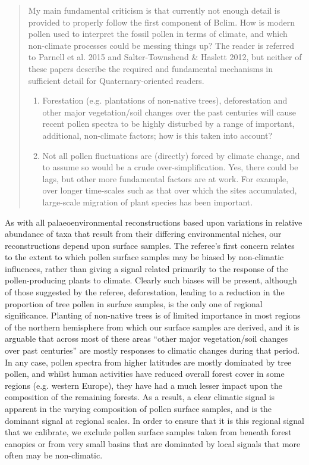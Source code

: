 \documentclass[a4paper,11pt]{article}
\begin{document}
\begin{framed} \begin{quote}
My main fundamental criticism is that currently not enough detail is provided to properly follow the first component of Bclim. How is modern pollen used to interpret the fossil pollen in terms of climate, and which non-climate processes could be messing things up? The reader is referred to Parnell et al. 2015 and Salter-Townshend \& Haslett 2012, but neither of these papers describe the required and fundamental mechanisms in sufficient detail for Quaternary-oriented readers.
\begin{enumerate}
\setcounter{enumi}{0}
\item Forestation (e.g. plantations of non-native trees), deforestation and other major vegetation/soil changes over the past centuries will cause recent pollen spectra to be highly disturbed by a range of important, additional, non-climate factors; how is this taken into account? 
\item Not all pollen fluctuations are (directly) forced by climate change, and to assume so would be a crude over-simplification. Yes, there could be lags, but other more fundamental factors are at work. For example, over longer time-scales such as that over which the sites accumulated, large-scale migration of plant species has been important. 
\end{enumerate}
\end{quote} \end{framed}

As with all palaeoenvironmental reconstructions based upon variations in relative abundance of taxa that result from their differing environmental niches, our reconstructions depend upon surface samples. The referee's first concern relates to the extent to which pollen surface samples may be biased by non-climatic influences, rather than giving a signal related primarily to the response of the pollen-producing plants to climate. Clearly such biases will be present, although of those suggested by the referee, deforestation, leading to a reduction in the proportion of tree pollen in surface samples, is the only one of regional significance. Planting of non-native trees is of limited importance in most regions of the northern hemisphere from which our surface samples are derived, and it is arguable that across most of these areas ``other major vegetation/soil changes over past centuries'' are mostly responses to climatic changes during that period. In any case, pollen spectra from higher latitudes are mostly dominated by tree pollen, and whilst human activities have reduced overall forest cover in some regions (e.g. western Europe), they have had a much lesser impact upon the composition of the remaining forests. As a result, a clear climatic signal is apparent in the varying composition of pollen surface samples, and is the dominant signal at regional scales. In order to ensure that it is this regional signal that we calibrate, we exclude pollen surface samples taken from beneath forest canopies or from very small basins that are dominated by local signals that more often may be non-climatic.\\
\end{document}
